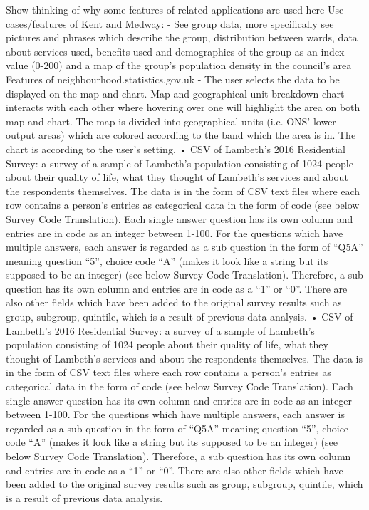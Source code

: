 Show thinking of why some features of related applications are used here
Use cases/features of Kent and Medway:
-	See group data, more specifically see pictures and phrases which describe the group, distribution between wards, data about services used, benefits used and demographics of the group as an index value (0-200) and a map of the group’s population density in the council’s area
Features of neighbourhood.statistics.gov.uk
-	The user selects the data to be displayed on the map and chart. Map and geographical unit breakdown chart interacts with each other where hovering over one will highlight the area on both map and chart. The map is divided into geographical units (i.e. ONS’ lower output areas) which are colored according to the band which the area is in. The chart is  according to the user’s setting.
•	CSV of Lambeth’s 2016 Residential Survey: a survey of a sample of Lambeth’s population consisting of 1024 people about their quality of life, what they thought of Lambeth’s services and about the respondents themselves. The data is in the form of CSV text files where each row contains a person’s entries as categorical data in the form of code (see below Survey Code Translation). Each single answer question has its own column and entries are in code as an integer between 1-100. For the questions which have multiple answers, each answer is regarded as a sub question in the form of “Q5A” meaning question “5”, choice code “A” (makes it look like a string but its supposed to be an integer) (see below Survey Code Translation). Therefore, a sub question has its own column and entries are in code as a “1” or “0”. There are also other fields which have been added to the original survey results such as group, subgroup, quintile, which is a result of previous data analysis.
•	CSV of Lambeth’s 2016 Residential Survey: a survey of a sample of Lambeth’s population consisting of 1024 people about their quality of life, what they thought of Lambeth’s services and about the respondents themselves. The data is in the form of CSV text files where each row contains a person’s entries as categorical data in the form of code (see below Survey Code Translation). Each single answer question has its own column and entries are in code as an integer between 1-100. For the questions which have multiple answers, each answer is regarded as a sub question in the form of “Q5A” meaning question “5”, choice code “A” (makes it look like a string but its supposed to be an integer) (see below Survey Code Translation). Therefore, a sub question has its own column and entries are in code as a “1” or “0”. There are also other fields which have been added to the original survey results such as group, subgroup, quintile, which is a result of previous data analysis.
